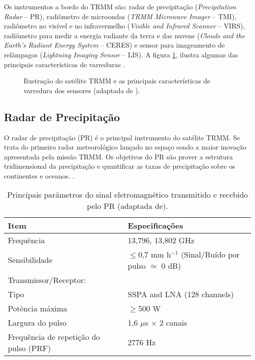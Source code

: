 Os instrumentos a bordo do TRMM são: radar de precipitação (\textit{Precipitation Radar} -- PR), radiômetro de microondas (\textit{TRMM Microwave Imager} -- TMI), radiômetro no visível e no infravermelho (\textit{Visible and Infrared Scanner} -- VIRS), radiômetro para medir a energia radiante da terra e das nuvens (\textit{Clouds and the Earth's Radiant Energy System} -- CERES) e sensor para imageamento de relâmpagos (\textit{Lightning Imaging Sensor} -- LIS). A figura \ref{figtrmm}, ilustra algumas das principais características de varreduras \cite{kummerok1998}.

\begin{figure}[!ht]
\caption{Ilustração do satélite TRMM e as  principais características de varredura dos sensores (adaptada de ).}
\label{figtrmm} 
\end{figure} 


\subsection{Radar de Precipitação}

O radar de precipitação (PR) é o principal instrumento do satélite TRMM. Se trata do primeiro radar meteorológico lançado no espaço sendo a maior inovação apresentada pela missão TRMM. Os objetivos do PR são prover a estrutura tridimensional da precipitação e quantificar as taxas de precipitação sobre os continentes e oceanos.  \cite{kummerok1998}. 


\begin{table}[!ht]
\caption{Principais parâmetros do sinal eletromagnético transmitido e recebido pelo PR (adaptada de).}
\label{PRparametros}
\centering
\small
\newcommand{\grayline}{\rowcolor[gray]{.88}}
\renewcommand {\tabularxcolumn }[1]{ >{\arraybackslash }m{#1}}
\begin{tabularx}{\textwidth}{l W } %
\hline\hline 
  Item & Especificações \\[1.5pt]
\hline
\grayline Frequência & 13,796, 13,802 GHz\\[1.5pt]
Sensibilidade & $\leq$0,7 mm h$^{-1}$ (Sinal/Ruído por pulso $\simeq$ 0 dB)\\[1.5pt]
\grayline  Transmissor/Receptor: & \\[1.5pt]
\grayline {~~~~~~~~~} Tipo & SSPA and LNA (128 channels)\\[1.5pt]
\grayline {~~~~~~~~~} Potência máxima & $\geq$500 W \\[1.5pt]
\grayline {~~~~~~~~~} Largura do pulso & 1,6 $\mu$s $\times$ 2 canais \\[1.5pt]
\grayline {~~~~~~~~~} Frequência de repetição do pulso (PRF) & 2776 Hz \\[1.5pt]
\hline 
\end{tabularx}
\end{table}


